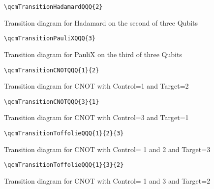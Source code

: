 \documentclass{article}
\begin{document}
\begin{figure}[!ht]
    \begin{verbatim}
\qcmTransitionHadamardQQQ{2}
    \end{verbatim}
    \centering
    \caption{Transition diagram for Hadamard on the second of three Qubits}
\end{figure}

\begin{figure}[!ht]
    \begin{verbatim}
\qcmTransitionPauliXQQQ{3}
    \end{verbatim}
    \centering
    \caption{Transition diagram for PauliX on the third of three Qubits}
\end{figure}

\begin{figure}[!ht]
    \begin{verbatim}
\qcmTransitionCNOTQQQ{1}{2}
    \end{verbatim}
    \centering
    \caption{Transition diagram for CNOT with Control=1 and Target=2}
\end{figure}

\begin{figure}[!ht]
    \begin{verbatim}
\qcmTransitionCNOTQQQ{3}{1}
    \end{verbatim}
    \centering
    \caption{Transition diagram for CNOT with Control=3 and Target=1}
\end{figure}

\begin{figure}[!ht]
    \begin{verbatim}
\qcmTransitionToffolieQQQ{1}{2}{3}
    \end{verbatim}
    \centering
    \caption{Transition diagram for CNOT with Control= 1 and 2 and Target=3}
\end{figure}

\begin{figure}[!ht]
    \begin{verbatim}
\qcmTransitionToffolieQQQ{1}{3}{2}
    \end{verbatim}
    \centering
    \caption{Transition diagram for CNOT with Control= 1 and 3 and Target=2}
\end{figure}
\end{document}
